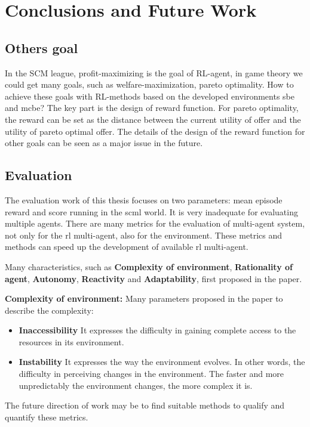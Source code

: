 \chapter{Conclusions and Future Work}

\section{Others goal}
In the SCM league, profit-maximizing is the goal of RL-agent, in game theory we could get many goals, such as welfare-maximization, pareto optimality. How to achieve these goals with RL-methods based on the developed environments \gls{sbe} and \gls{mcbe}? The key part is the design of reward function. For pareto optimality, the reward can be set as the distance between the current utility of offer and the utility of pareto optimal offer. The details of the design of the reward function for other goals can be seen as a major issue in the future.

\section{Evaluation}
The evaluation work of this thesis focuses on two parameters: mean episode reward and score running in the \gls{scml} world. It is very inadequate for evaluating multiple agents. There are many metrics for the evaluation of multi-agent system, not only for the \gls{rl} multi-agent, also for the environment. These metrics and methods can speed up the development of available \gls{rl} multi-agent. 

Many characteristics, such as \textbf{Complexity of environment}, \textbf{Rationality of agent}, \textbf{Autonomy}, \textbf{Reactivity} and \textbf{Adaptability}, first proposed in the paper\parencite{Bitonto2010}.

\textbf{Complexity of environment:} Many parameters proposed in the paper  to describe the complexity:
\begin{itemize}
\item \textbf{Inaccessibility} It expresses the difficulty in gaining complete access to the resources in its environment.
\item \textbf{Instability} It expresses the way the environment evolves. In other words, the difficulty in perceiving changes in the environment. The faster and more unpredictably the environment changes, the more complex it is.
\end{itemize}

The future direction of work may be to find suitable methods to qualify and quantify these metrics.

